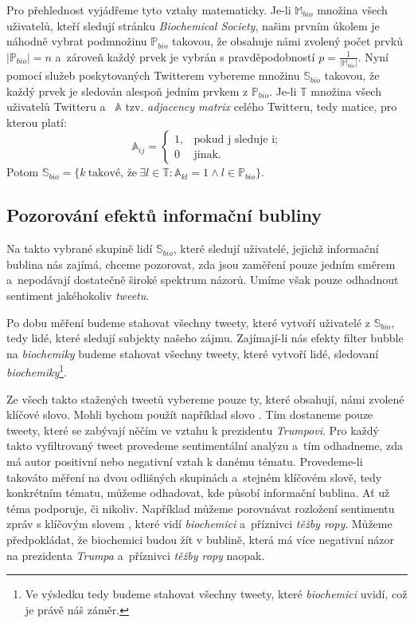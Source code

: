 \documentclass[12pt, a4paper]{article}
\numberwithin{equation}{section} 	%
\begin{document}
Pro přehlednost vyjádřeme tyto vztahy matematicky. Je-li $\mathbb{M}_{bio}$ množina všech uživatelů, kteří sledují stránku \textit{Biochemical Society}, našim prvním úkolem je náhodně vybrat podmnožinu $\mathbb{P}_{bio}$ takovou, že obsahuje námi zvolený počet prvků $\left\vert{\mathbb{P}_{bio}}\right\vert = n$ a~zároveň každý prvek je vybrán s pravděpodobností $p = \frac{1}{\left\vert{\mathbb{M}_{bio}}\right\vert}$. Nyní pomocí služeb poskytovaných Twitterem vybereme množinu $\mathbb{S}_{bio}$ takovou, že každý prvek je sledován alespoň jedním prvkem z $\mathbb{P}_{bio}$. Je-li $\mathbb{T}$ množina všech uživatelů Twitteru a~ $\mathbb{A}$ tzv. \textit{adjacency matrix} celého Twitteru, tedy matice, pro kterou platí:
\begin{equation}
    \mathbb{A}_{ij}=
    \begin{cases}
        1, &\text{pokud j sleduje i;}\\
        0 &\text{jinak.}
    \end{cases}
\end{equation}
Potom $\mathbb{S}_{bio} = \{k\ \text{takové, že}\ \exists l\in\mathbb{T}: \mathbb{A}_{kl} = 1 \wedge l\in\mathbb{P}_{bio} \}$.

\subsection{Pozorování efektů informační bubliny}
\noindent Na takto vybrané skupině lidí $\mathbb{S}_{bio}$, které sledují uživatelé, jejichž informační bublina nás zajímá, chceme pozorovat, zda jsou zaměření pouze jedním směrem a~nepodávají dostatečně široké spektrum názorů. Umíme však pouze odhadnout sentiment jakéhokoliv \textit{tweetu}.

Po dobu měření budeme stahovat všechny tweety, které vytvoří uživatelé z $\mathbb{S}_{bio}$, tedy lidé, které sledují subjekty našeho zájmu. Zajímají-li nás efekty filter bubble na \textit{biochemiky} budeme stahovat všechny tweety, které vytvoří lidé, sledovaní \textit{biochemiky}\footnote{Ve výsledku tedy budeme stahovat všechny tweety, které \textit{biochemici} uvidí, což je právě náš záměr.}.

Ze všech takto stažených tweetů vybereme pouze ty, které obsahují, námi zvolené klíčové slovo. Mohli bychom použít například slovo \textit{}. Tím dostaneme pouze tweety, které se zabývají něčím ve vztahu k prezidentu \textit{Trumpovi}. Pro každý takto vyfiltrovaný tweet provedeme sentimentální analýzu a~tím odhadneme, zda má autor positivní nebo negativní vztah k danému tématu. Provedeme-li takováto měření na dvou odlišných skupinách a~stejném klíčovém slově, tedy konkrétním tématu, můžeme odhadovat, kde působí informační bublina. Ať už téma podporuje, či nikoliv. Například můžeme porovnávat rozložení sentimentu zpráv s klíčovým slovem \textit{}, které vidí \textit{biochemici} a~příznivci \textit{těžby ropy}. Můžeme předpokládat, že biochemici budou žít v bublině, která má více negativní názor na prezidenta \textit{Trumpa} a~příznivci \textit{těžby ropy} naopak.
\end{document}
